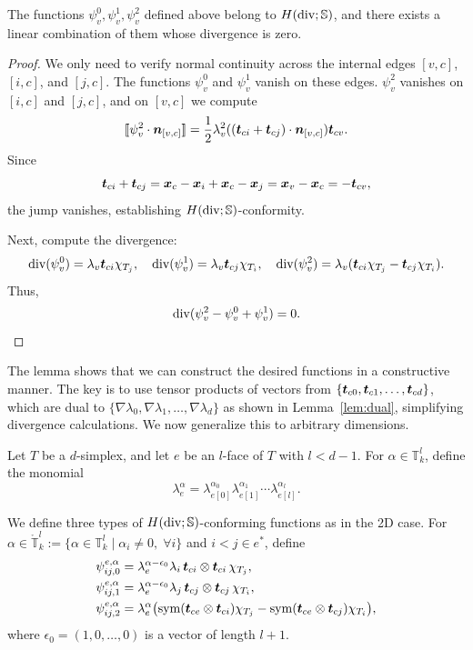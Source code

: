 \documentclass[letterpaper,12pt]{article}
\begin{document}
\begin{lemma}
\label{lem:diver}
The functions $\psi_v^0, \psi_v^1, \psi_v^2$ defined above belong to $H(\mathop{\mathrm{div}}; \mathbb{S})$, and there exists a linear combination of them whose divergence is zero.
\end{lemma}

\begin{proof}
We only need to verify normal continuity across the internal edges $[v, c]$, $[i, c]$, and $[j, c]$. The functions $\psi_v^0$ and $\psi_v^1$ vanish on these edges. $\psi_v^2$ vanishes on $[i, c]$ and $[j, c]$, and on $[v, c]$ we compute
\[
[\![\psi_v^2 \cdot \boldsymbol{n}_{[v,c]}]\!] = \frac{1}{2} \lambda_v^2 ((\boldsymbol{t}_{ci} + \boldsymbol{t}_{cj}) \cdot \boldsymbol{n}_{[v, c]}) \boldsymbol{t}_{cv}.
\]
Since
\[
\boldsymbol{t}_{ci} + \boldsymbol{t}_{cj} = \boldsymbol{x}_c - \boldsymbol{x}_i + \boldsymbol{x}_c - \boldsymbol{x}_j = \boldsymbol{x}_v - \boldsymbol{x}_c = -\boldsymbol{t}_{cv},
\]
the jump vanishes, establishing $H(\mathop{\mathrm{div}}; \mathbb{S})$-conformity.

Next, compute the divergence:
\[
\mathop{\mathrm{div}}(\psi_v^0) = \lambda_v \boldsymbol{t}_{ci} \chi_{T_j}, \quad 
\mathop{\mathrm{div}}(\psi_v^1) = \lambda_v \boldsymbol{t}_{cj} \chi_{T_i}, \quad 
\mathop{\mathrm{div}}(\psi_v^2) = \lambda_v (\boldsymbol{t}_{ci} \chi_{T_j} - \boldsymbol{t}_{cj} \chi_{T_i}).
\]
Thus,
\[
\mathop{\mathrm{div}}(\psi_v^2 - \psi_v^0 + \psi_v^1) = 0.
\]
\end{proof}

The lemma shows that we can construct the desired functions in a constructive manner. The key is to use tensor products of vectors from $\{\boldsymbol{t}_{c0}, \boldsymbol{t}_{c1}, \ldots, \boldsymbol{t}_{cd}\}$, which are dual to $\{\nabla \lambda_0, \nabla \lambda_1, \ldots, \nabla \lambda_d\}$ as shown in Lemma~\ref{lem:dual}, simplifying divergence calculations. We now generalize this to arbitrary dimensions.

Let $T$ be a $d$-simplex, and let $e$ be an $l$-face of $T$ with $l < d-1$. For $\alpha \in \mathbb{T}_k^l$, define the monomial
$$
\lambda_e^\alpha = \lambda_{e[0]}^{\alpha_0} \lambda_{e[1]}^{\alpha_1} \cdots \lambda_{e[l]}^{\alpha_l}.
$$

We define three types of $H(\mathop{\mathrm{div}}; \mathbb{S})$-conforming functions as in the 2D case. For $\alpha \in \mathring{\mathbb{T}}_k^l := \{\alpha \in \mathbb{T}_k^l \mid \alpha_i \ne 0,\; \forall i\}$ and $i<j \in e^*$, define
\begin{align*}
\psi_{ij,0}^{e,\alpha} &= \lambda_e^{\alpha - \epsilon_0} \lambda_i\, \boldsymbol{t}_{ci} \otimes \boldsymbol{t}_{ci}\, \chi_{T_j},\\
\psi_{ij,1}^{e,\alpha} &= \lambda_e^{\alpha - \epsilon_0} \lambda_j\, \boldsymbol{t}_{cj} \otimes \boldsymbol{t}_{cj}\, \chi_{T_i},\\
\psi_{ij,2}^{e,\alpha} &= \lambda_e^{\alpha} \bigl(\operatorname{sym}(\boldsymbol{t}_{ce} \otimes \boldsymbol{t}_{ci}) \chi_{T_j} - \operatorname{sym}(\boldsymbol{t}_{ce} \otimes \boldsymbol{t}_{cj}) \chi_{T_i}\bigr),
\end{align*}
where $\epsilon_0 = (1, 0, \ldots, 0)$ is a vector of length $l+1$.
\end{document}
